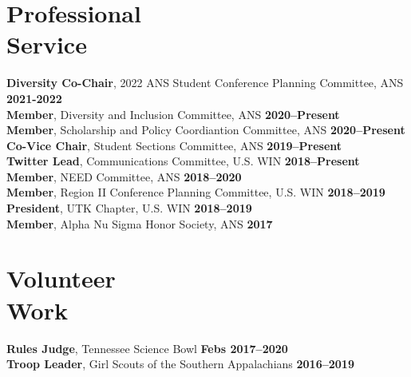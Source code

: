 \documentclass[margin,line]{resume}
\begin{document}
\begin{resume}
    \section{\mysidestyle Professional\\Service}
                \textbf{Diversity Co-Chair}, 2022 ANS Student Conference Planning Committee, ANS \hfill 
                \textbf{2021-2022} \\
                \textbf{Member}, Diversity and Inclusion Committee, ANS  \hfill \textbf{2020--Present}\vspace{.5mm}\\%
                \textbf{Member}, Scholarship and Policy Coordiantion Committee, ANS  \hfill \textbf{2020--Present}\vspace{.5mm}\\%
                \textbf{Co-Vice Chair}, Student Sections Committee, ANS  \hfill \textbf{2019--Present}\vspace{.5mm}\\%
                \textbf{Twitter Lead}, Communications Committee, U.S. WIN  \hfill \textbf{2018--Present}\vspace{.5mm}\\%
                \textbf{Member}, NEED Committee, ANS  \hfill \textbf{2018--2020}\vspace{.5mm}\\%
                \textbf{Member}, Region II Conference Planning Committee, U.S. WIN  \hfill \textbf{2018--2019}\vspace{.5mm}\\%
                \textbf{President}, UTK Chapter, U.S. WIN  \hfill \textbf{2018--2019}\vspace{.5mm}\\%
                \textbf{Member}, Alpha Nu Sigma Honor Society, ANS \hfill \textbf{2017}\vspace{.5mm}%
    
    \section{\mysidestyle Volunteer\\Work}
                \textbf{Rules Judge}, Tennessee Science Bowl \hfill \textbf{Febs 2017--2020}\\
                \textbf{Troop Leader}, Girl Scouts of the Southern Appalachians \hfill \textbf{2016--2019}\vspace{.5mm}\\%
                

\end{resume}
\end{document}
